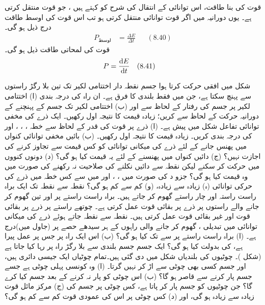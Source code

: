 قوت کی بنا طاقت،    اس  توانائی کے انتقال کی شرح کو کہتے ہیں ، جو قوت منتقل کرتی ہے۔ یوں  دورانیہ میں اگر قوت  توانائی   منتقل کرتی ہو تب اس قوت کی  اوسط  طاقت  درج ذیل ہو گی۔
\begin{align*}
P_{\text{اوسط}}&=\frac{\Delta E}{\Delta t} &&(8.40)
\end{align*}
قوت کی لمحاتی طاقت  ذیل ہو گی۔
\begin{align*}
P&=\frac{\dif E}{\dif t} &&(8.41)
\end{align*}

\setcounter{questioncounter}{0}
شکل  میں  افقی حرکت کرتا ہوا   جسم  نقطہ دار اختتامی لکیر تک تین بلا رگڑ راستوں سے پہنچ سکتا ہے، جن میں فقط بلندی کا فرق ہے۔ ان راہ کی درجہ بندی (ا) اختتامی لکیر پر جسم کی  رفتار کے لحاظ سے  اور (ب) اختتامی لکیر تک جسم کے  پہنچنے کے دورانیہ حرکت کے لحاظ سے کریں؛ زیادہ قیمت  کا نتیجہ  اول رکھیں۔
ایک ذرے کی مخفی توانائی تفاعل شکل  میں پیش ہے۔ (ا)  ذرے پر قوت کی قدر کے لحاظ سے خطہ ، ، ، اور  کی درجہ بندی کریں۔ زیادہ قیمت  کا نتیجہ  اول رکھیں۔ (ب)  بائیں مخفی توانائی کنواں  میں  پھنس جانے  کے لئے ذرے کی میکانی توانائی   کو کس  قیمت  سے تجاوز  کرنے کی اجازت نہیں؟ (ج) دائیں کنواں میں پھنسنے کے لئے یہ قیمت کیا ہو گی؟ (د) دونوں کنووں میں حرکت کر سکنے لیکن نقطہ  سے دائیں نکلنے کی صلاحیت نہ رکھنے کی صورت میں وہ قیمت کیا ہو گی؟ جزو  د کی صورت میں  ، ، اور  میں سے کس خطہ  میں  ذرے کی  حرکی توانائی (ہ) زیادہ سے زیادہ، (و) کم سے کم ہو گی؟  
نقطہ  سے نقطہ  تک ایک  براہ راست  راستہ اور چار  راستے گھوم کر جاتے  ہیں۔ براہ راست راستے پر اور تین  گھوم کر جانے  والے راستوں پر  ذرے پر  بقائی قوت  عمل کرتی ہے۔ چوتھے راستے پر  ذرے پر بقائی قوت  اور غیر بقائی قوت   عمل کرتی ہیں۔ نقطہ  سے نقطہ    جاتے ہوئے ذرے کی  میکانی توانائی میں  تبدیلی   ، گھوم کر جانے والی راہوں کے ہر  سیدھے حصے پر     (جاول میں)درج  ہے۔ (ا)  براہ راست راستے پر  سے   تک  کیا ہو گی؟ (ب) اس ایک راہ پر جس پر  عمل پیرا ہے،     کی بدولت  کیا ہو گی؟
ایک جسم جسم       بلندی سے   بلا رگڑ راہ پر   رہا کیا جاتا ہے (شکل )۔  چوٹیوں کی بلندیاں شکل میں  دی گئی ہیں۔تمام چوٹیاں  ایک جیسی دائری ہیں، اور جسم کسی بھی چوٹی سے اڑ کر نہیں  گرتا۔ (ا)  وہ  کونسی  پہلی چوٹی ہے جسے جسم پار کرنے سے قاصر ہو گا؟  (ب)  اس چوٹی کو پار نہ کرنے کے بعد جسم کیا کرے گا؟ جن چوٹیوں کو جسم پار کر پاتا ہے،  کس چوٹی پر جسم کی  (ج) مرکز مائل قوت  زیادہ سے زیادہ ہو گی، اور (د) کس چوٹی پر اس کی عمودی قوت کم سے کم ہو گی؟
